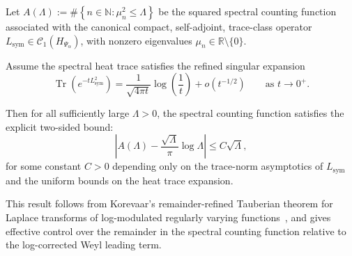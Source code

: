 \begin{lemma}
\label{lem:explicit-korevaar-tauberian-bound}
Let \( A(\Lambda) := \#\left\{ n \in \mathbb{N} : \mu_n^2 \le \Lambda \right\} \) be the squared spectral counting function associated with the canonical compact, self-adjoint, trace-class operator \( L_{\mathrm{sym}} \in \mathcal{C}_1(H_{\Psi_\alpha}) \), with nonzero eigenvalues \( \mu_n \in \mathbb{R} \setminus \{0\} \).

Assume the spectral heat trace satisfies the refined singular expansion
\[
\operatorname{Tr}(e^{-t L_{\mathrm{sym}}^2}) = \frac{1}{\sqrt{4\pi t}} \log\left( \frac{1}{t} \right) + o(t^{-1/2}) \qquad \text{as } t \to 0^+.
\]

Then for all sufficiently large \( \Lambda > 0 \), the spectral counting function satisfies the explicit two-sided bound:
\[
\left| A(\Lambda) - \frac{\sqrt{\Lambda}}{\pi} \log \Lambda \right| \le C \sqrt{\Lambda},
\]
for some constant \( C > 0 \) depending only on the trace-norm asymptotics of \( L_{\mathrm{sym}} \) and the uniform bounds on the heat trace expansion.

\medskip
\noindent
This result follows from Korevaar’s remainder-refined Tauberian theorem for Laplace transforms of log-modulated regularly varying functions~\cite[Ch.~III, §5]{Korevaar2004Tauberian}, and gives effective control over the remainder in the spectral counting function relative to the log-corrected Weyl leading term.
\end{lemma}
